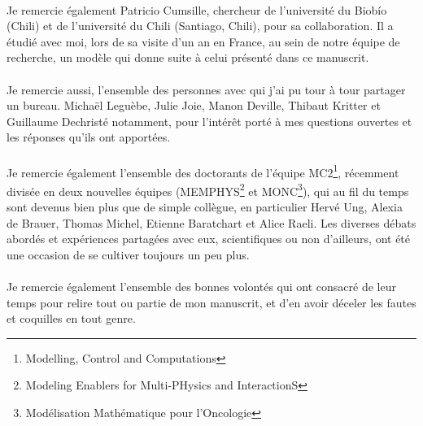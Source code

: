 \paragraph{}
Je remercie également Patricio Cumsille, chercheur de l'université du Biobío (Chili) et de l'université du Chili (Santiago, Chili), pour sa collaboration. Il a étudié avec moi, lors de sa visite d'un an en France, au sein de notre équipe de recherche, un modèle qui donne suite à celui présenté dans ce manuscrit. 

\paragraph{}
Je remercie aussi, l'ensemble des personnes avec qui j'ai pu tour à tour partager un bureau. Michaël Leguèbe, Julie Joie, Manon Deville, Thibaut Kritter et Guillaume Dechristé notamment, pour l'intérêt porté à mes questions ouvertes et les réponses qu'ils ont apportées.

\paragraph{}
Je remercie également l'ensemble des doctorants de l'équipe MC2\footnote{Modelling, Control and Computations}, récemment divisée en deux nouvelles équipes (MEMPHYS\footnote{Modeling Enablers for Multi-PHysics and InteractionS} et MONC\footnote{Modélisation Mathématique pour l'Oncologie}), qui au fil du temps sont devenus bien plus que de simple collègue, en particulier Hervé Ung, Alexia de Brauer, Thomas Michel, Etienne Baratchart et Alice Raeli. Les diverses débats abordés et expériences partagées avec eux, scientifiques ou non d'ailleurs, ont été une occasion de se cultiver toujours un peu plus.

\paragraph{}
Je remercie également l'ensemble des bonnes volontés qui ont consacré de leur temps pour relire tout ou partie de mon manuscrit, et d'en avoir déceler les fautes et coquilles en tout genre. 
